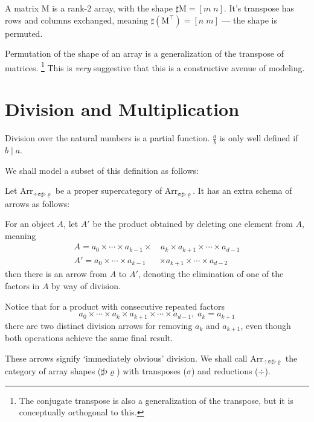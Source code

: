 \documentclass{DIKU-report-variant}
\newcommand\mrm[1]{\mathrm{#1}}
\newcommand\brm[1]{\bm{\mrm{#1}}}
\newcommand\Arr[1]{{\brm{Arr}_{\brm{#1}}}}
\newcommand\SSFR{\sigma\sharp\flat\varrho}
\newcommand\DSSFR{\div\sigma\sharp\flat\varrho}
\begin{document}
A matrix \(\brm M\) is a rank-2 array, with the shape \(\sharp \brm M = [m\;n]\).
It's transpose has rows and columns exchanged, meaning \(\sharp( \brm M^\intercal) = [n\;m]\)
--- the shape is permuted.

Permutation of the shape of an array is a generalization of the transpose of matrices.
\footnote{The conjugate transpose is also a generalization of the transpose, but it
is conceptually orthogonal to this.}
This is \emph{very} suggestive that this is a constructive avenue of modeling.

\section{Division and Multiplication}

Division over the natural numbers is
a partial function. \(\frac a b\) is only well defined if \(b\mid a\).

We shall model a subset of this definition as follows:

\begin{definition}
  \label{def:category-of-reductions}
  Let \(\Arr\DSSFR\) be a proper supercategory of \(\Arr\SSFR\).
  It has an extra schema of arrows as follows:
  
  For an object \(A\), let \(A'\) be the product obtained by deleting
  one element from \(A\), meaning
  \begin{align*}
    A = a_0 \times\cdots\times a_{k-1} \times &\,a_k \times a_{k+1}\times\cdots\times a_{d-1} \\
    A' = a_0 \times\cdots\times a_{k-1} &\times a_{k+1}\times\cdots\times a_{d-2}
  \end{align*}
  then there is an arrow from \(A\) to \(A'\), denoting the elimination of one
  of the factors in \(A\) by way of division.

  \begin{center}
  \end{center}

  Notice that for a product with consecutive repeated
  factors \[a_0 \times \cdots \times a_k \times a_{k+1} \times \cdots \times a_{d-1},\; a_k = a_{k+1}\]
  there are two distinct division arrows for removing \(a_k\) and \(a_{k+1}\), even
  though both operations achieve the same final result.

  These arrows signify `immediately obvious' division.
  We shall call \(\Arr\DSSFR\) the category of array shapes (\(\sharp\flat\varrho\)) with
  transposes (\(\sigma\)) and reductions (\(\div\)).
\end{definition}
\end{document}
